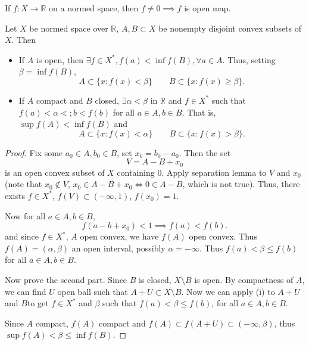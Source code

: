 \begin{remark}
	If $f: X \to \mathbb{R}$ on a normed space, then $f \neq 0 \implies f $ is open map.
\end{remark}

\begin{theorem}
	\label{thm:Separation}
	
	Let $X$ be normed space over $\mathbb{R}$, $A, B \subset X$ be nonempty disjoint convex subsets of $X$. Then
	\begin{itemize}
		\item If $A$ is open, then $\exists  f \in X^*, f(a) < \inf  f(B), \forall a \in A$. Thus, setting $\beta = \inf f(B),$
			\[
				A \subset \{x: f(x) < \beta\} \qquad B \subset \{x: f(x) \ge \beta\} 
			.\] 
		\item If $A$ compact and $B$ closed, $\exists \alpha < \beta$ in $\mathbb{R}$ and $f \in X^*$ such that  $f(a) < \alpha < ;b < f(b)$ for all $a \in A, b \in B$. That is, $\sup f(A) < \inf f(B)$ and
			\[
				A \subset \{x: f(x) < \alpha\}  \qquad B \subset \{x: f(x) > \beta\} 
			.\] 
	\end{itemize}
\end{theorem}
\begin{proof}
	Fix some $a_0 \in A, b_0 \in B$, set $x_0 = b_0 - a_0$. Then the set
	\[
		V = A - B + x_0
	\] 
	is an open convex subset of $X$ containing $0$. Apply separation lemma to $V$ and $x_0$ (note that $x_0 \not\in V$, $x_0 \in A - B + x_0 \iff 0 \in A - B$, which is not true). Thus, there exists $f \in X^*$, $f(V) \subset (- \infty , 1)$, $f(x_0) = 1$.

	Now for all $a \in A, b \in B$,
	\[
		f(a - b + x_0) < 1 \implies f(a) < f(b)
	.\] 
	and since $f \in X^*$, $A$ open convex, we have $f(A)$ open convex. Thus $f(A) = (\alpha ,\beta)$ an open interval, possibly $\alpha = - \infty $. Thus $f(a) < \beta \le f(b)$ for all $a \in A, b \in B$.

	Now prove the second part. Since $B$ is closed, $X \setminus B$ is open. By compactness of $A$, we can find $U$ open ball such that $A + U \subset X \setminus B$. Now we can apply (i) to $A + U$ and $B$to get $f \in X^*$ and $\beta$ such that $f(a) < \beta \le f(b)$, for all $a \in A, b \in B$.
	
	Since $A$ compact, $f(A)$ compact and $f(A) \subset f(A + U) \subset (- \infty , \beta)$, thus $\sup f(A) < \beta \le \inf  f(B)$.
	 
\end{proof}



